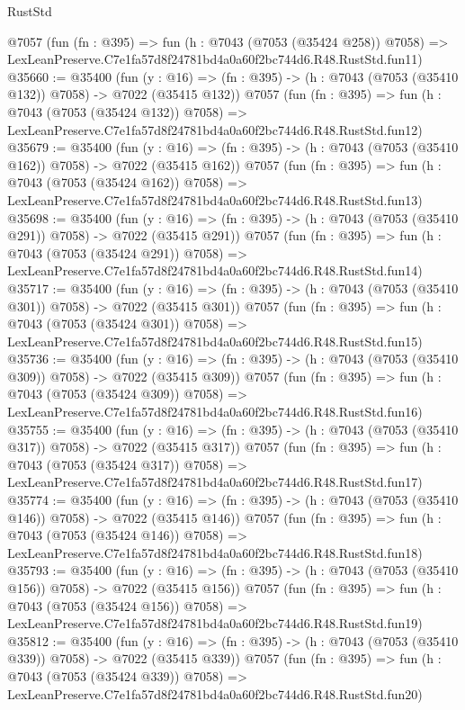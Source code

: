 \begin{lexlean}{RustStd}
\begin{coremodule}
    @7057
    (fun (fn : @395) =>
    fun (h : @7043 (@7053 (@35424 @258)) @7058) =>
    LexLeanPreserve.C7e1fa57d8f24781bd4a0a60f2bc744d6.R48.RustStd.fun11)
@35660 := @35400
    (fun (y : @16) => (fn : @395) -> (h : @7043 (@7053 (@35410 @132)) @7058) -> @7022 (@35415 @132))
    @7057
    (fun (fn : @395) =>
    fun (h : @7043 (@7053 (@35424 @132)) @7058) =>
    LexLeanPreserve.C7e1fa57d8f24781bd4a0a60f2bc744d6.R48.RustStd.fun12)
@35679 := @35400
    (fun (y : @16) => (fn : @395) -> (h : @7043 (@7053 (@35410 @162)) @7058) -> @7022 (@35415 @162))
    @7057
    (fun (fn : @395) =>
    fun (h : @7043 (@7053 (@35424 @162)) @7058) =>
    LexLeanPreserve.C7e1fa57d8f24781bd4a0a60f2bc744d6.R48.RustStd.fun13)
@35698 := @35400
    (fun (y : @16) => (fn : @395) -> (h : @7043 (@7053 (@35410 @291)) @7058) -> @7022 (@35415 @291))
    @7057
    (fun (fn : @395) =>
    fun (h : @7043 (@7053 (@35424 @291)) @7058) =>
    LexLeanPreserve.C7e1fa57d8f24781bd4a0a60f2bc744d6.R48.RustStd.fun14)
@35717 := @35400
    (fun (y : @16) => (fn : @395) -> (h : @7043 (@7053 (@35410 @301)) @7058) -> @7022 (@35415 @301))
    @7057
    (fun (fn : @395) =>
    fun (h : @7043 (@7053 (@35424 @301)) @7058) =>
    LexLeanPreserve.C7e1fa57d8f24781bd4a0a60f2bc744d6.R48.RustStd.fun15)
@35736 := @35400
    (fun (y : @16) => (fn : @395) -> (h : @7043 (@7053 (@35410 @309)) @7058) -> @7022 (@35415 @309))
    @7057
    (fun (fn : @395) =>
    fun (h : @7043 (@7053 (@35424 @309)) @7058) =>
    LexLeanPreserve.C7e1fa57d8f24781bd4a0a60f2bc744d6.R48.RustStd.fun16)
@35755 := @35400
    (fun (y : @16) => (fn : @395) -> (h : @7043 (@7053 (@35410 @317)) @7058) -> @7022 (@35415 @317))
    @7057
    (fun (fn : @395) =>
    fun (h : @7043 (@7053 (@35424 @317)) @7058) =>
    LexLeanPreserve.C7e1fa57d8f24781bd4a0a60f2bc744d6.R48.RustStd.fun17)
@35774 := @35400
    (fun (y : @16) => (fn : @395) -> (h : @7043 (@7053 (@35410 @146)) @7058) -> @7022 (@35415 @146))
    @7057
    (fun (fn : @395) =>
    fun (h : @7043 (@7053 (@35424 @146)) @7058) =>
    LexLeanPreserve.C7e1fa57d8f24781bd4a0a60f2bc744d6.R48.RustStd.fun18)
@35793 := @35400
    (fun (y : @16) => (fn : @395) -> (h : @7043 (@7053 (@35410 @156)) @7058) -> @7022 (@35415 @156))
    @7057
    (fun (fn : @395) =>
    fun (h : @7043 (@7053 (@35424 @156)) @7058) =>
    LexLeanPreserve.C7e1fa57d8f24781bd4a0a60f2bc744d6.R48.RustStd.fun19)
@35812 := @35400
    (fun (y : @16) => (fn : @395) -> (h : @7043 (@7053 (@35410 @339)) @7058) -> @7022 (@35415 @339))
    @7057
    (fun (fn : @395) =>
    fun (h : @7043 (@7053 (@35424 @339)) @7058) =>
    LexLeanPreserve.C7e1fa57d8f24781bd4a0a60f2bc744d6.R48.RustStd.fun20)

\end{coremodule}
\end{lexlean}
